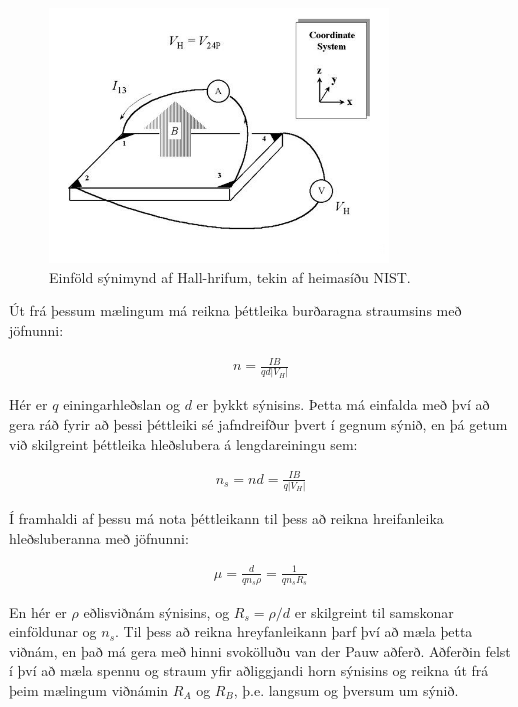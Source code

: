 \documentclass[11pt]{article}
\begin{document}
\begin{figure}[H]
\centering
	\includegraphics[width = 90mm]{fig3.jpg}
	\caption{Einföld sýnimynd af Hall-hrifum, tekin af heimasíðu NIST.}
	\label{fig:nist2}
\end{figure}

Út frá þessum mælingum má reikna þéttleika burðaragna straumsins með jöfnunni:

\begin{align}
n = \frac{IB}{qd|V_H|}
\end{align}

Hér er $q$ einingarhleðslan og $d$ er þykkt sýnisins. Þetta má einfalda með því að gera ráð fyrir að þessi þéttleiki sé jafndreifður þvert í gegnum sýnið, en þá getum við skilgreint þéttleika hleðslubera á lengdareiningu sem:

\begin{align}
n_s = nd = \frac{IB}{q|V_H|}
\end{align}

Í framhaldi af þessu má nota þéttleikann til þess að reikna hreifanleika hleðsluberanna með jöfnunni:

\begin{align}
    \mu = \frac{d}{qn_s\rho} = \frac{1}{qn_sR_s}
\end{align}

En hér er $\rho$ eðlisviðnám sýnisins, og $R_s = \rho/d$ er skilgreint til samskonar einföldunar og $n_s$. Til þess að reikna hreyfanleikann þarf því að mæla þetta viðnám, en það má gera með hinni svokölluðu van der Pauw aðferð. Aðferðin felst í því að mæla spennu og straum yfir aðliggjandi horn sýnisins og reikna út frá þeim mælingum viðnámin $R_A$ og $R_B$, þ.e. langsum og þversum um sýnið.
\end{document}
